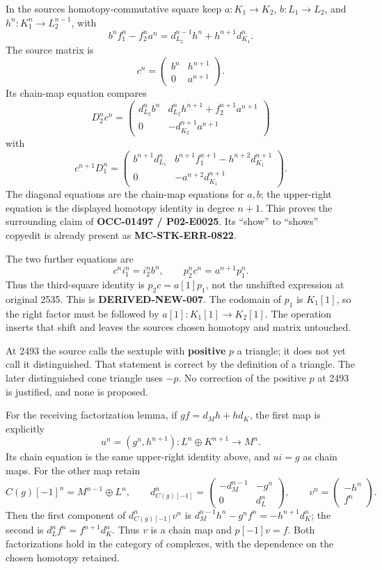 \documentclass[11pt]{article}
\begin{document}
In the source\textquotesingle s homotopy-commutative square keep \(a:K_1\to K_2\),\allowbreak{} \(b:L_1\to L_2\),\allowbreak{} and \(h^n:K_1^n\to L_2^{n-1}\),\allowbreak{} with \[
b^nf_1^n-f_2^na^n=d_{L_2}^{n-1}h^n+h^{n+1}d_{K_1}^n.
\] The source matrix is \[
c^n=\begin{pmatrix}b^n&h^{n+1}\\0&a^{n+1}\end{pmatrix}.
\] Its chain-map equation compares \[
D_2^nc^n=
\begin{pmatrix}
d_{L_2}^nb^n&d_{L_2}^nh^{n+1}+f_2^{n+1}a^{n+1}\\
0&-d_{K_2}^{n+1}a^{n+1}
\end{pmatrix}
\] with \[
c^{n+1}D_1^n=
\begin{pmatrix}
b^{n+1}d_{L_1}^n&b^{n+1}f_1^{n+1}-h^{n+2}d_{K_1}^{n+1}\\
0&-a^{n+2}d_{K_1}^{n+1}
\end{pmatrix}.
\] The diagonal equations are the chain-map equations for \(a,b\); the upper-right equation is the displayed homotopy identity in degree \(n+1\). This proves the surrounding claim of \textbf{OCC-01497 /\allowbreak{} P02-E0025}. Its ``show'' to ``shows'' copyedit is already present as \textbf{MC-STK-ERR-0822}.

The two further equations are \[
c^ni_1^n=i_2^nb^n,\qquad p_2^nc^n=a^{n+1}p_1^n.
\] Thus the third-square identity is \(p_2c=a[1]p_1\),\allowbreak{} not the unshifted expression at original 2535. This is \textbf{DERIVED-NEW-007}. The codomain of \(p_1\) is \(K_1[1]\),\allowbreak{} so the right factor must be followed by \(a[1]:K_1[1]\to K_2[1]\). The operation inserts that shift and leaves the source\textquotesingle s chosen homotopy and matrix untouched.

At 2493 the source calls the sextuple with \textbf{positive} \(p\) a triangle; it does not yet call it distinguished. That statement is correct by the definition of a triangle. The later distinguished cone triangle uses \(-p\). No correction of the positive \(p\) at 2493 is justified,\allowbreak{} and none is proposed.

For the receiving factorization lemma,\allowbreak{} if \(gf=d_Mh+hd_K\),\allowbreak{} the first map is explicitly \[
u^n=(g^n,h^{n+1}):L^n\oplus K^{n+1}\to M^n.
\] Its chain equation is the same upper-right identity above,\allowbreak{} and \(ui=g\) as chain maps. For the other map retain \[
C(g)[-1]^n=M^{n-1}\oplus L^n,\qquad
d_{C(g)[-1]}^n=
\begin{pmatrix}-d_M^{n-1}&-g^n\\0&d_L^n\end{pmatrix},\qquad
v^n=\begin{pmatrix}-h^n\\f^n\end{pmatrix}.
\] Then the first component of \(d_{C(g)[-1]}^nv^n\) is \(d_M^{n-1}h^n-g^nf^n=-h^{n+1}d_K^n\); the second is \(d_L^nf^n=f^{n+1}d_K^n\). Thus \(v\) is a chain map and \(p[-1]v=f\). Both factorizations hold in the category of complexes,\allowbreak{} with the dependence on the chosen homotopy retained.
\end{document}
